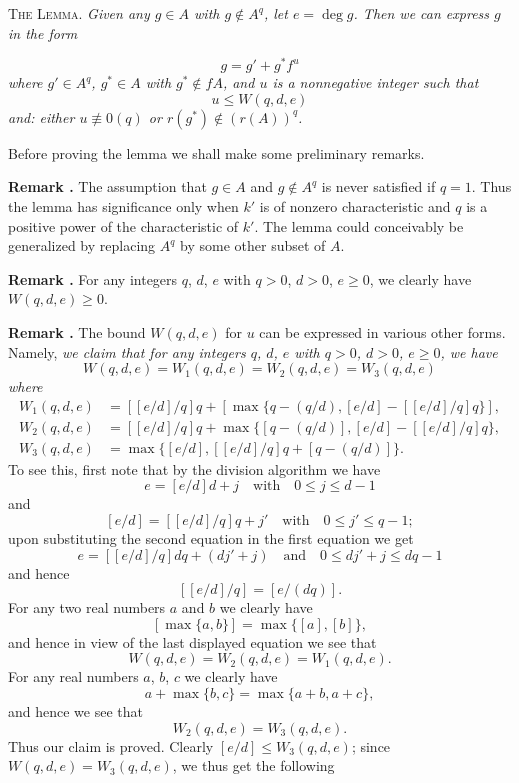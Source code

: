 \medskip
\textsc{The Lemma.} {\em Given any $g\in A$ with $g\not\in A^{q}$, let $e=\deg g$. Then we can express $g$ in the form}

\eject

$$
g=g'+g^{*}f^{u}
$$\pageoriginale
{\em where $g'\in A^{q}$, $g^{*}\in A$ with $g^{*}\not\in fA$, and $u$ is a nonnegative integer such that}
$$
u\leq W(q,d,e)
$$
{\em and: either $u\nequiv 0(q)$ or $r(g^{*})\not\in (r(A))^{q}$.}


Before proving the lemma we shall make some preliminary remarks.

\smallskip
\noindent
{\bf Remark .\label{art01-rem1}}
The assumption that $g\in A$ and $g\not\in A^{q}$ is never satisfied if $q=1$. Thus the lemma has significance only when $k'$ is of nonzero characteristic and $q$ is a positive power of the characteristic of $k'$. The lemma could conceivably be generalized by replacing $A^{q}$ by some other subset of $A$.

\smallskip
\noindent
{\bf Remark .\label{art01-rem2}}
For any integers $q$, $d$, $e$ with $q>0$, $d>0$, $e\geq 0$, we clearly have $W(q,d,e)\geq 0$.

\smallskip
\noindent
{\bf Remark .\label{art01-rem3}}
The bound $W(q,d,e)$ for $u$ can be expressed in various other forms. Namely, {\em we claim that for any integers $q$, $d$, $e$ with $q>0$, $d>0$, $e\geq 0$, we have}
$$
W(q,d,e)=W_{1}(q,d,e)=W_{2}(q,d,e)=W_{3}(q,d,e)
$$
{\em where}
\begin{align*}
W_{1}(q,d,e) &= [[e/d]/q]q+[\max\{q-(q/d),[e/d]-[[e/d]/q]q\}],\\
W_{2}(q,d,e) &= [[e/d]/q]q+\max \{[q-(q/d)],[e/d]-[[e/d]/q]q\},\\
W_{3}(q,d,e) &= \max \{[e/d],[[e/d]/q]q+[q-(q/d)]\}.
\end{align*}
To see this, first note that by the division algorithm we have
$$
e=[e/d]d+j\text{~~ with~~ } 0\leq j\leq d-1
$$
and
$$
[e/d]=[[e/d]/q]q+j'\text{~~ with~~ } 0\leq j'\leq q-1;
$$
upon substituting the second equation in the first equation we get 
$$
e=[[e/d]/q]dq+(dj'+j)\text{~~ and~~ } 0\leq dj'+j\leq dq-1
$$
and hence
$$
[[e/d]/q]=[e/(dq)].
$$\pageoriginale
For any two real numbers $a$ and $b$ we clearly have 
$$
[\max \{a,b\}]=\max \{[a],[b]\},
$$ 
and hence in view of the last displayed equation we see that
$$
W(q,d,e)=W_{2}(q,d,e)=W_{1}(q,d,e).
$$
For any real numbers $a$, $b$, $c$ we clearly have
$$
a+\max \{b,c\}=\max \{a+b,a+c\},
$$
and hence we see that
$$
W_{2}(q,d,e)=W_{3}(q,d,e).
$$
Thus our claim is proved. Clearly $[e/d]\leq W_{3}(q,d,e)$; since $W(q,d,e)=W_{3}(q,d,e)$, we thus get the following

